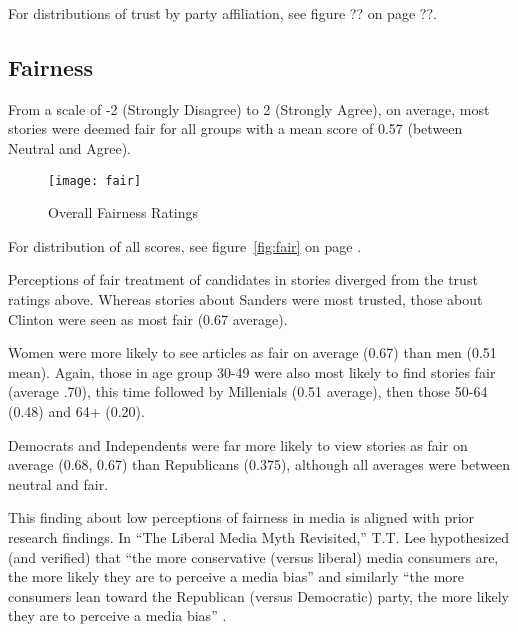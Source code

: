 For distributions of trust by party affiliation, see figure ?? on page ??.

\subsection{Fairness}
From a scale of -2 (Strongly Disagree) to 2 (Strongly Agree), on average, most stories were deemed fair for all groups with a mean score of 0.57 (between Neutral and Agree). 

\begin{figure}[H]  
\centering 
  \texttt{[image: fair]}  
  \caption{Overall Fairness Ratings 
  \label{fig:fairness}}
\end{figure}

For distribution of all scores, see figure~\ref{fig:fair} on page \pageref{fig:fair}.

Perceptions of fair treatment of candidates in stories diverged from the trust ratings above. Whereas stories about Sanders were most trusted, those about Clinton were seen as most fair (0.67 average).


Women were more likely to see articles as fair on average (0.67) than men (0.51 mean).
Again, those in age group 30-49 were also most likely to find stories fair (average .70), this time followed by Millenials (0.51 average), then those 50-64 (0.48) and 64+ (0.20).

Democrats and Independents were far more likely to view stories as fair on average (0.68, 0.67) than Republicans (0.375), although all averages were between neutral and fair.

This finding about low perceptions of fairness in media is aligned with prior research findings. In ``The Liberal Media Myth Revisited,'' T.T. Lee hypothesized (and verified) that ``the more conservative (versus liberal) media consumers are, the more likely they are to perceive a media bias'' and similarly ``the more consumers lean toward the Republican (versus Democratic) party, the more likely they are to perceive a media bias'' \cite{lee2005liberal}.

